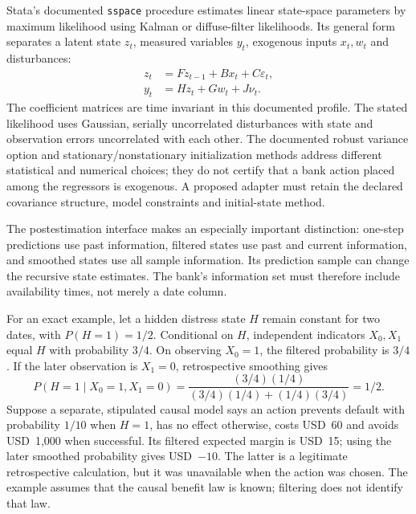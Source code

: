 Stata's documented \texttt{sspace} procedure estimates linear state-space
parameters by maximum likelihood using Kalman or diffuse-filter likelihoods.
Its general form separates a latent state $z_t$, measured variables $y_t$,
exogenous inputs $x_t,w_t$ and disturbances:
\begin{equation}
\begin{aligned}
 z_t&=Fz_{t-1}+Bx_t+C\varepsilon_t,\\
 y_t&=Hz_t+Gw_t+J\nu_t.
\end{aligned}
\label{exec22:state-model}
\end{equation}
The coefficient matrices are time invariant in this documented profile.
The stated likelihood uses Gaussian, serially uncorrelated disturbances with
state and observation errors uncorrelated with each other. The documented robust
variance option and stationary/nonstationary initialization methods address
different statistical and numerical choices; they do not certify that a bank
action placed among the regressors is exogenous. A proposed adapter must retain
the declared covariance structure, model constraints and initial-state method.
\citep{exec22_state_stata_sspace}

The postestimation interface makes an especially important distinction:
one-step predictions use past information, filtered states use past and current
information, and smoothed states use all sample information. Its prediction
sample can change the recursive state estimates. The bank's information set
must therefore include availability times, not merely a date column.
\citep{exec22_state_stata_sspace_post}

For an exact example, let a hidden distress state $H$ remain constant for two
dates, with $P(H=1)=1/2$. Conditional on $H$, independent indicators $X_0,X_1$
equal $H$ with probability $3/4$. On observing $X_0=1$, the filtered probability
is $3/4$. If the later observation is $X_1=0$, retrospective smoothing gives
\begin{equation}
 P(H=1\mid X_0=1,X_1=0)
 =\frac{(3/4)(1/4)}{(3/4)(1/4)+(1/4)(3/4)}=1/2.
 \label{exec22:state-smoothing}
\end{equation}
Suppose a separate, stipulated causal model says an action prevents default with
probability $1/10$ when $H=1$, has no effect otherwise, costs USD~60 and avoids
USD~1,000 when successful. Its filtered expected margin is USD~15; using the
later smoothed probability gives USD~$-10$. The latter is a legitimate
retrospective calculation, but it was unavailable when the action was chosen.
The example assumes that the causal benefit law is known; filtering does not
identify that law.~\citep{exec22_state_reference}

